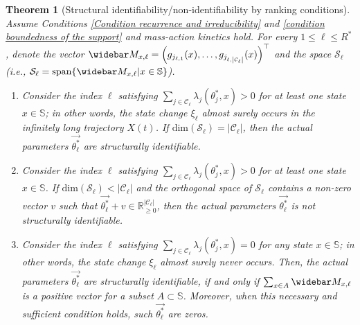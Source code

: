 \documentclass[pdflatex,sn-mathphys-num]{sn-jnl}%
\theoremstyle{thmstyleone}%
\newtheorem{theorem}{Theorem}%
\theoremstyle{thmstyletwo}%
\theoremstyle{thmstylethree}%
\begin{document}
\begin{theorem}[Structural identifiability/non-identifiability by ranking conditions]\label{thm structural identification via ranking conditions}
    Assume Conditions \ref{Condition recurrence and irreducibility} and \ref{condition boundedness of the support} and mass-action kinetics hold.
    For every $1 \leq \ell \leq R^*$, denote the vector $\widebar M_{x,\ell} = \left(g_{j_{\ell, 1}}(x), \dots, g_{j_{\ell, \left|\mathcal C_\ell\right|}}(x)\right)^{\top}$ 
    and the space $\mathcal S_\ell$  (i.e., $\mathcal S_\ell = \text{span} \{ \widebar M_{x,\ell}| x\in \mathbb S\}$).
    \begin{enumerate}   
        \item[(1)] Consider the index $\ell$ satisfying $\sum_{j\in\mathcal C_\ell}\lambda_{j}(\theta^*_j,x) > 0$ for at least one state $x\in \mathbb S$; in other words, the state change $\xi_\ell$ almost surely occurs in the infinitely long trajectory $X(t)$.
        If $\text{dim}(\mathcal S_\ell) = |\mathcal C_\ell|$, then the actual parameters $\overrightarrow {\theta^*_\ell}$ are structurally identifiable. 
        \\[-1pt]
        
        \item[(2)] Consider the index $\ell$ satisfying $\sum_{j\in\mathcal C_\ell}\lambda_{j}(\theta^*_j,x) > 0$ for at least one state $x\in \mathbb S$. 
        If $\text{dim}(\mathcal S_\ell) < |\mathcal C_\ell|$ and the orthogonal space of $\mathcal S_\ell$ contains a non-zero vector $v$ such that $\overrightarrow {\theta^*_\ell} + v \in \mathbb R^{|\mathcal C_\ell|}_{\geq 0}$, then the actual parameters $\overrightarrow {\theta^*_\ell}$ is not structurally identifiable. 
        \\[-1pt]
        
        \item[(3)] Consider the index $\ell$ satisfying $\sum_{j\in\mathcal C_\ell}\lambda_{j}(\theta^*_j,x) = 0$ for any state $x\in \mathbb S$; in other words, the state change $\xi_\ell$ almost surely never occurs. 
        Then, the actual parameters $\overrightarrow {\theta^*_\ell}$ are structurally identifiable, if and only if $\sum_{x\in A} \widebar M_{x,\ell}$ is a positive vector for a subset $A\subset \mathbb S$.
        Moreover, when this necessary and sufficient condition holds, such $\overrightarrow {\theta^*_\ell} $ are zeros.  
    \end{enumerate}
\end{theorem}
\end{document}

